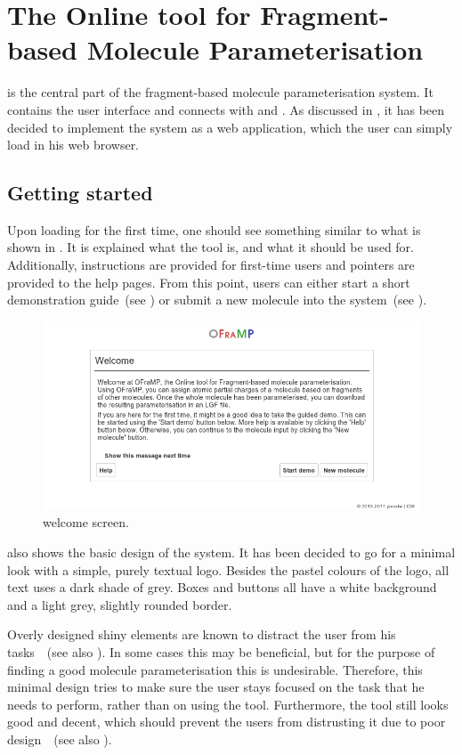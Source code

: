 \section[\oframp]{The Online tool for Fragment-based Molecule Parameterisation}
\oframp{} is the central part of the fragment-based molecule parameterisation system. It contains the user interface and connects with \oapoc{} and \omfraf{}. As discussed in , it has been decided to implement the system as a web application, which the user can simply load in his web browser.

\subsection{Getting started}

Upon loading \oframp{} for the first time, one should see something similar to what is shown in . It is explained what the tool is, and what it should be used for. Additionally, instructions are provided for first-time users and pointers are provided to the help pages. From this point, users can either start a short demonstration guide~(see ) or submit a new molecule into the system~(see ).

\begin{figure}
\center
\includegraphics[width=.9\textwidth]{img/impl_welcome.png}
\caption{\oframp{} welcome screen.}
\end{figure}

 also shows the basic design of the system. It has been decided to go for a minimal look with a simple, purely textual logo. Besides the pastel colours of the logo, all text uses a dark shade of grey. Boxes and buttons all have a white background and a light grey, slightly rounded border.

Overly designed shiny elements are known to distract the user from his tasks~\cite{norman1990interfaces}~(see also ). In some cases this may be beneficial, but for the purpose of finding a good molecule parameterisation this is undesirable. Therefore, this minimal design tries to make sure the user stays focused on the task that he needs to perform, rather than on using the tool. Furthermore, the tool still looks good and decent, which should prevent the users from distrusting it due to poor design~\cite{norman2002emotion}~(see also ).

